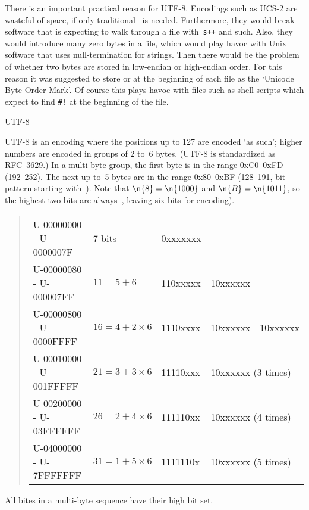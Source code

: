 There is an important practical reason for UTF-8. Encodings such as
UCS-2 are wasteful of space, if only traditional \ascii\ is
needed. Furthermore, they would break software that is expecting to
walk through a file with~\verb-s++- and such. Also, they would
introduce many zero bytes in a file, which would play havoc with Unix
software that uses null-termination for strings. Then there would be
the problem of whether two bytes are stored in low-endian or
high-endian order. For this reason it was suggested to store 
or  at the beginning of each file as the `Unicode Byte Order
Mark'. Of course this plays havoc with files such as shell scripts
which expect to find \verb+#!+ at the beginning of the file.

 {UTF-8}

UTF-8 is an encoding where the positions up to 127 are encoded `as
such'; higher numbers are encoded in groups of 2 to~6 bytes. (UTF-8 is
standardized as RFC~3629.) In a multi-byte group, the first byte is in
the range 0xC0--0xFD (192--252). The next up to~5 bytes are in the
range 0x80--0xBF (128--191, bit pattern starting with~). Note that
$\n{8}=\n{1000}$ and $\n{B}=\n{1011}$, so the highest two bits are
always~, leaving six bits for encoding).

\begin{quote}\begin{footnotesize}
\begin{ttfamily}\begin{tabular}{|l|llll|}
\hline
U-00000000 - U-0000007F&\textrm{7 bits}&
0xxxxxxx&&\\
U-00000080 - U-000007FF&$11=5+6$&
110xxxxx&10xxxxxx&\\
U-00000800 - U-0000FFFF&$16=4+2\times6$&
1110xxxx&10xxxxxx&10xxxxxx\\
U-00010000 - U-001FFFFF&$21=3+3\times6$&
11110xxx&\multicolumn{2}{l|}{10xxxxxx (3 times)}\\
U-00200000 - U-03FFFFFF&$26=2+4\times6$&
111110xx&\multicolumn{2}{l|}{10xxxxxx (4 times)}\\
U-04000000 - U-7FFFFFFF&$31=1+5\times6$&
1111110x&\multicolumn{2}{l|}{10xxxxxx (5 times)}\\\hline
  \end{tabular}
\end{ttfamily}
  \end{footnotesize}
\end{quote}

All bites in a multi-byte sequence have their high bit set.

